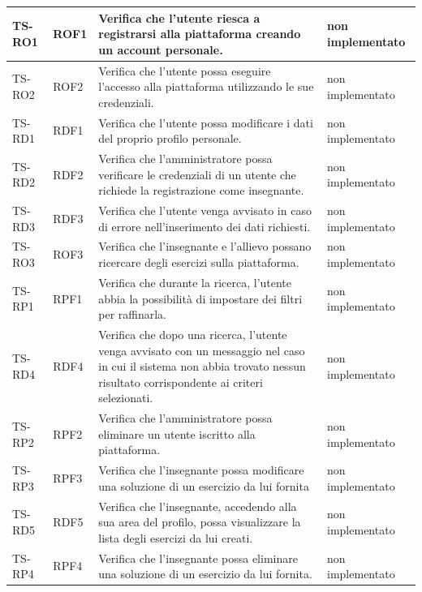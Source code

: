 \begin{longtable}{|>{\centering\arraybackslash}m{1.6cm}|>{\centering\arraybackslash}m{1.7cm}|m{6.41cm}|>{\centering\arraybackslash}m{3.1cm}|}
		\hline
		\rowcolor{LightGray}
		TS-RO1
		& ROF1 
		& Verifica che l'utente riesca a registrarsi alla piattaforma creando un account personale. 
		& non implementato\\ \hline
		\rowcolor{white}
		TS-RO2
		& ROF2 
		& Verifica che l'utente possa eseguire l'accesso alla piattaforma utilizzando le sue credenziali.
		& non implementato\\ \hline
		\rowcolor{LightGray}
		TS-RD1
		& RDF1 
		& Verifica che l'utente possa modificare i dati del proprio profilo personale.
		& non implementato\\ \hline
		\rowcolor{white}
		TS-RD2
		& RDF2 
		& Verifica che l'amministratore possa verificare le credenziali di un utente che richiede la registrazione come insegnante. 
		& non implementato\\ \hline
		\rowcolor{LightGray}
		TS-RD3
		& RDF3 
		& Verifica che l'utente venga avvisato in caso di errore nell'inserimento dei dati richiesti.
		& non implementato\\ \hline
		\rowcolor{white}
		TS-RO3		
		& ROF3 
		& Verifica che l'insegnante e l'allievo possano ricercare degli esercizi sulla piattaforma.
		& non implementato\\ \hline
		\rowcolor{LightGray}
		TS-RP1		
		& RPF1 
		& Verifica che durante la ricerca, l'utente abbia la possibilità di impostare dei filtri per raffinarla. 		
		& non implementato\\ \hline
		\rowcolor{white}
		TS-RD4		
		& RDF4 
		& Verifica che dopo una ricerca, l'utente venga avvisato con un messaggio nel caso in cui il sistema non abbia trovato nessun risultato corrispondente ai criteri selezionati.
		& non implementato\\ \hline
		\rowcolor{LightGray}
		TS-RP2		
		& RPF2 
		& Verifica che l'amministratore possa eliminare un utente iscritto alla piattaforma.
		& non implementato\\ \hline
		\rowcolor{white}
		TS-RP3		
		& RPF3 
		& Verifica che l'insegnante possa modificare una soluzione di un esercizio da lui fornita
		& non implementato\\ \hline
		\rowcolor{LightGray}
		TS-RD5		
		& RDF5 
		& Verifica che l'insegnante, accedendo alla sua area del profilo, possa visualizzare la lista degli esercizi da lui creati. 
		& non implementato\\ \hline
		\rowcolor{white}
		TS-RP4		
		& RPF4 
		& Verifica che l'insegnante possa eliminare una soluzione di un esercizio da lui fornita. 
		& non implementato\\ \hline

\end{longtable}
